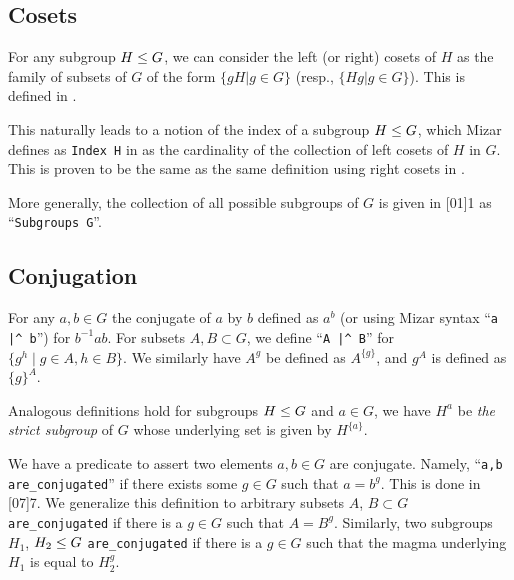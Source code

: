 {\subsection{Cosets}
For any subgroup $H\leq G$, we can consider the left (or right)
cosets of $H$ as the family of subsets of $G$ of the form
$\{gH|g\in G\}$ (resp., $\{Hg|g\in G\}$). This is defined in
.

This naturally leads to a notion of the index of a subgroup $H\leq G$,
which Mizar defines as \verb#Index H# in
 as the
cardinality of the collection of left cosets of $H$ in $G$. This is
proven to be the same as the same definition using right cosets in
.

More generally, the collection of all possible subgroups of $G$ is given
in [01]{1} as
``\verb#Subgroups G#''.

\subsection{Conjugation}
For any $a,b\in G$ the conjugate of $a$ by $b$ defined as $a^{b}$ (or
using Mizar syntax ``\verb#a |^ b#'')
for $b^{-1}ab$. For subsets $A,B\subset G$, we define
``\verb#A |^ B#'' for $\{g^{h}\mid g\in A,h\in B\}$. We similarly have
$A^{g}$ be defined as $A^{\{g\}}$, and $g^{A}$ is defined as $\{g\}^{A}$.

Analogous definitions hold for subgroups $H\leq G$ and $a\in G$, we
have $H^{a}$ be \emph{the strict subgroup} of $G$ whose underlying set
is given by $H^{\{a\}}$.

We have a predicate to assert two elements $a,b\in G$ are
conjugate. Namely, ``\verb#a,b are_conjugated#'' if there exists some
$g\in G$ such that $a = b^{g}$. This is done in
[07]{7}. We generalize this
definition to arbitrary subsets $A$, $B\subset G$ \verb#are_conjugated# if
there is a $g\in G$ such that $A = B^{g}$. Similarly, two subgroups
$H_{1}$, $H_{2}\leq G$ \verb#are_conjugated# if there is a $g\in G$
such that the magma underlying $H_{1}$ is equal to $H_{2}^{g}$.

}
